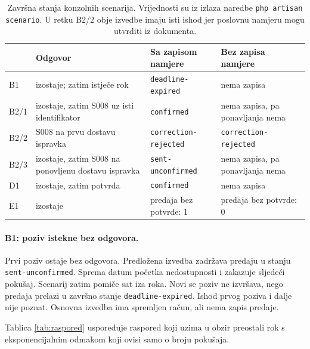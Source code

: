 \begin{table}[H]
\centering
\caption[Scenariji i završna stanja]{Završna stanja konzolnih scenarija.
Vrijednosti su iz izlaza naredbe \texttt{php artisan scenario}. U retku B2/2
obje izvedbe imaju isti ishod jer poslovnu namjeru mogu utvrditi iz
dokumenta.}
\label{tab:scenariji}
\small
\begin{tabular}{@{}p{}p{}p{}p{}@{}}
\toprule
& Odgovor & Sa zapisom namjere & Bez zapisa namjere \\
\midrule
B1 & izostaje; zatim istječe rok & \texttt{deadline-expired} & nema zapisa \\
\addlinespace
B2/1 & izostaje, zatim S008 uz isti identifikator & \texttt{confirmed} &
nema zapisa, pa ponavljanja nema \\
\addlinespace
B2/2 & S008 na prvu dostavu ispravka & \texttt{correction-rejected} &
\texttt{correction-rejected} \\
\addlinespace
B2/3 & izostaje, zatim S008 na ponovljenu dostavu ispravka &
\texttt{sent-unconfirmed} & nema zapisa, pa ponavljanja nema \\
\addlinespace
D1 & izostaje, zatim potvrda & \texttt{confirmed} & nema zapisa \\
\addlinespace
E1 & izostaje & predaja bez potvrde: 1 & predaja bez potvrde: 0 \\
\bottomrule
\end{tabular}
\end{table}

\paragraph{B1: poziv istekne bez odgovora.}
Prvi poziv ostaje bez odgovora. Predložena izvedba zadržava predaju u stanju
\texttt{sent-unconfirmed}. Sprema datum početka nedostupnosti i zakazuje
sljedeći pokušaj. Scenarij zatim pomiče sat iza roka. Novi se poziv ne
izvršava, nego predaja prelazi u završno stanje
\texttt{deadline-expired}. Ishod prvog poziva i dalje nije poznat. Osnovna
izvedba ima spremljen račun, ali nema zapis predaje.

Tablica \ref{tab:raspored} uspoređuje raspored koji uzima u obzir preostali rok
s eksponencijalnim odmakom koji ovisi samo o broju pokušaja.

